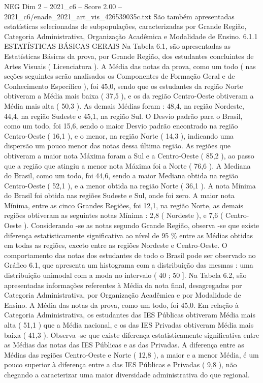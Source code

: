 \begin{textsample}{NEG Dim 2 – 2021\_c6 – Score 2.00 – 2021\_c6/enade\_2021\_art\_vis\_426539035c.txt}
São também apresentadas estatísticas selecionadas de subpopulações, caracterizadas por Grande Região, Categoria Administrativa, Organização Acadêmica e Modalidade de Ensino. 6.1.1 ESTATÍSTICAS BÁSICAS GERAIS Na Tabela 6.1, são apresentadas as Estatísticas Básicas da prova, por Grande Região, dos estudantes concluintes de Artes Visuais ( Licenciatura ).
A Média das notas da prova, como um todo ( nas seções seguintes serão analisados os Componentes de Formação Geral e de Conhecimento Específico ), foi 45,0, sendo que os estudantes da região Norte obtiveram a Média mais baixa ( 37,5 ), e os da região Centro-Oeste obtiveram a Média mais alta ( 50,3 ).
As demais Médias foram : 48,4, na região Nordeste, 44,4, na região Sudeste e 45,1, na região Sul.
O Desvio padrão para o Brasil, como um todo, foi 15,6, sendo o maior Desvio padrão encontrado na região Centro-Oeste ( 16,1 ), e o menor, na região Norte ( 14,3 ), indicando uma dispersão um pouco menor das notas dessa última região.
As regiões que obtiveram a maior nota Máxima foram a Sul e a Centro-Oeste ( 85,2 ), ao passo que a região que atingiu a menor nota Máxima foi a Norte ( 76,6 ).
A Mediana do Brasil, como um todo, foi 44,6, sendo a maior Mediana obtida na região Centro-Oeste ( 52,1 ), e a menor obtida na região Norte ( 36,1 ).
A nota Mínima do Brasil foi obtida nas regiões Sudeste e Sul, onde foi zero.
A maior nota Mínima, entre as cinco Grandes Regiões, foi 12,1, na região Norte, as demais regiões obtiveram as seguintes notas Mínima : 2,8 ( Nordeste ), e 7,6 ( Centro-Oeste ).
Considerando -se as notas segundo Grande Região, observa -se que existe diferença estatisticamente significativa ao nível de 95 \% entre as Médias obtidas em todas as regiões, exceto entre as regiões Nordeste e Centro-Oeste.
O comportamento das notas dos estudantes de todo o Brasil pode ser observado no Gráfico 6.1, que apresenta um histograma com a distribuição das mesmas : uma distribuição unimodal com a moda no intervalo ( 40 ; 50 ].
Na Tabela 6.2, são apresentadas informações referentes à Média da nota final, desagregadas por Categoria Administrativa, por Organização Acadêmica e por Modalidade de Ensino.
A Média das notas da prova, como um todo, foi 45,0.
Em relação à Categoria Administrativa, os estudantes das IES Públicas obtiveram Média mais alta ( 51,1 ) que a Média nacional, e os das IES Privadas obtiveram Média mais baixa ( 41,3 ).
Observa -se que existe diferença estatisticamente significativa entre as Médias das notas das IES Públicas e as das Privadas.
A diferença entre as Médias das regiões Centro-Oeste e Norte ( 12,8 ), a maior e a menor Média, é um pouco superior à diferença entre a das IES Públicas e Privadas ( 9,8 ), não chegando a caracterizar uma maior diversidade administrativa do que regional.

\end{textsample}
